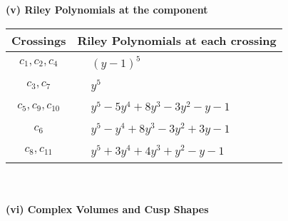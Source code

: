 \documentclass[1p]{elsarticle_modified}
\theoremstyle{definition}
\begin{document}
\newpage\renewcommand{\arraystretch}{1}
\flushleft \textbf{(v) Riley Polynomials at the component}\newline \\
\begin{tabular}{m{50pt}|m{274pt}}
Crossings & \hspace{64pt}Riley Polynomials at each crossing \\
\hline $$\begin{aligned}c_{1},c_{2},c_{4}\end{aligned}$$&$\begin{aligned}
&(y-1)^5
\end{aligned}$\\
\hline $$\begin{aligned}c_{3},c_{7}\end{aligned}$$&$\begin{aligned}
&y^5
\end{aligned}$\\
\hline $$\begin{aligned}c_{5},c_{9},c_{10}\end{aligned}$$&$\begin{aligned}
&y^5-5 y^4+8 y^3-3 y^2- y-1
\end{aligned}$\\
\hline $$\begin{aligned}c_{6}\end{aligned}$$&$\begin{aligned}
&y^5- y^4+8 y^3-3 y^2+3 y-1
\end{aligned}$\\
\hline $$\begin{aligned}c_{8},c_{11}\end{aligned}$$&$\begin{aligned}
&y^5+3 y^4+4 y^3+y^2- y-1
\end{aligned}$\\
\hline
\end{tabular}\\~\\
\newpage\flushleft \textbf{(vi) Complex Volumes and Cusp Shapes}
\end{document}
